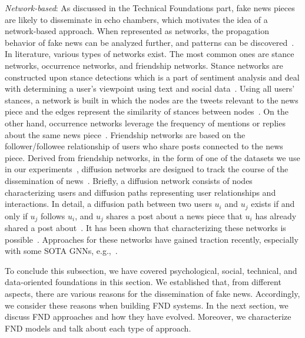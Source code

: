 \begin{description}
    \item{\emph{Network-based}:} As discussed in the Technical Foundations part, fake news pieces are likely to disseminate in echo chambers, which motivates the idea of a network-based approach. When represented as networks, the propagation behavior of fake news can be analyzed further, and patterns can be discovered~\parencite{FakeNewsDetectionOnSocialMediaADataMiningPerspective_Shu}. In literature, various types of networks exist. The most common ones are stance networks, occurrence networks, and friendship networks. Stance networks are constructed upon stance detections which is a part of sentiment analysis and deal with determining a user’s viewpoint using text and social data~\parencite{StanceClassificationAttention_Du}. Using all users’ stances, a network is built in which the nodes are the tweets relevant to the news piece and the edges represent the similarity of stances between nodes~\parencite{NewsVerificationByExploitingConflictingSocialViewpoints_Jin, SomeLikeItHoaxDataset_Tacchini}. On the other hand, occurrence networks leverage the frequency of mentions or replies about the same news piece~\parencite{ProminentFeaturesOfRumorPropagation_Kwon}. Friendship networks are based on the follower/followee relationship of users who share posts connected to the news piece. Derived from friendship networks, in the form of one of the datasets we use in our experiments~\parencite{UPFD_Dataset_Shu}, diffusion networks are designed to track the course of the dissemination of news~\parencite{ProminentFeaturesOfRumorPropagation_Kwon}. Briefly, a diffusion network consists of nodes characterizing users and diffusion paths representing user relationships and interactions. In detail, a diffusion path between two users $u_i$ and $u_j$ exists if and only if $u_j$ follows $u_i$, and $u_j$ shares a post about a news piece that $u_i$ has already shared a post about~\parencite{FakeNewsDetectionOnSocialMediaADataMiningPerspective_Shu}. It has been shown that characterizing these networks is possible~\parencite{ProminentFeaturesOfRumorPropagation_Kwon}. Approaches for these networks have gained traction recently, especially with some SOTA GNNs, e.g.,~\parencite{FakeNewsDetectionUsingGeometricDeepLearning_Monti}.
\end{description}
To conclude this subsection, we have covered psychological, social, technical, and data-oriented foundations in this section. We established that,  from different aspects, there are various reasons for the dissemination of fake news. Accordingly, we consider these reasons when building FND systems. In the next section, we discuss FND approaches and how they have evolved. Moreover, we characterize FND models and talk about each type of approach.

